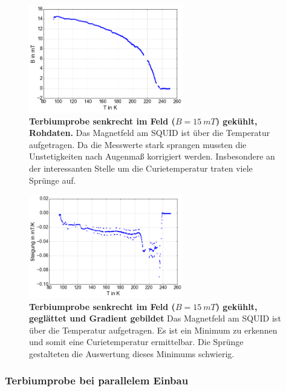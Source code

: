 \documentclass[a4paper,ngerman]{scrartcl}
\begin{document}
\begin{figure}
\centering
\includegraphics[width=0.6\textwidth]{abbildungen/Tb_sr_150.png}
\caption[Terbiumprobe senkrecht bei 15mT]{\textbf{Terbiumprobe senkrecht im Feld ($B = \SI{15}{mT}$) gekühlt, Rohdaten.} 
Das Magnetfeld am SQUID ist über die Temperatur aufgetragen. 
Da die Messwerte stark sprangen mussten die Unstetigkeiten nach Augenmaß korrigiert werden.
Insbesondere an der interessanten Stelle um die Curietemperatur traten viele Sprünge auf.}
\label{fig:Tb_sr_15}
\end{figure}




\begin{figure}
\centering
\includegraphics[width=0.6\textwidth]{abbildungen/Tb_sr_150_grad.png}
\caption[Terbiumprobe senkrecht bei Nullfeld]{\textbf{Terbiumprobe senkrecht im Feld ($B = \SI{15}{mT}$) gekühlt, geglättet und Gradient gebildet} 
Das Magnetfeld am SQUID ist über die Temperatur aufgetragen. 
Es ist ein Minimum zu erkennen und somit eine Curietemperatur ermittelbar.
Die Sprünge gestalteten die Auswertung dieses Minimums schwierig.}
\label{fig:Tb_sr_15_grad}
\end{figure}


\subsubsection{Terbiumprobe bei parallelem Einbau}
\end{document}
